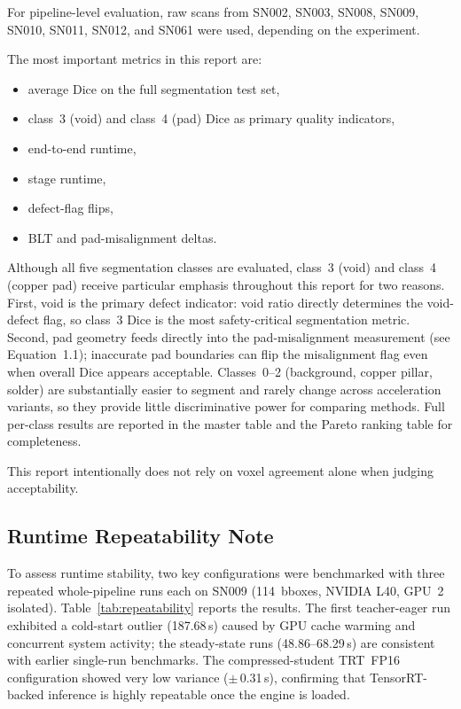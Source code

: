For pipeline-level evaluation, raw scans from SN002,
SN003, SN008, SN009, SN010,
SN011, SN012, and SN061 were used, depending
on the experiment.

The most important metrics in this report are:

\begin{itemize}
\tightlist
\item
  average Dice on the full segmentation test set,
\item
  class~3 (void) and class~4 (pad) Dice as primary quality indicators,
\item
  end-to-end runtime,
\item
  stage runtime,
\item
  defect-flag flips,
\item
  BLT and pad-misalignment deltas.
\end{itemize}

Although all five segmentation classes are evaluated, class~3 (void) and class~4 (copper pad) receive particular emphasis throughout this report for two reasons. First, void is the primary defect indicator: void ratio directly determines the void-defect flag, so class~3 Dice is the most safety-critical segmentation metric. Second, pad geometry feeds directly into the pad-misalignment measurement (see Equation~1.1); inaccurate pad boundaries can flip the misalignment flag even when overall Dice appears acceptable. Classes~0--2 (background, copper pillar, solder) are substantially easier to segment and rarely change across acceleration variants, so they provide little discriminative power for comparing methods. Full per-class results are reported in the master table and the Pareto ranking table for completeness.

This report intentionally does not rely on voxel agreement alone when
judging acceptability.

\hypertarget{runtime-repeatability-note}{%
\subsection{Runtime Repeatability
Note}\label{runtime-repeatability-note}}

To assess runtime stability, two key configurations were benchmarked
with three repeated whole-pipeline runs each on SN009 (114~bboxes,
NVIDIA L40, GPU~2 isolated). Table~\ref{tab:repeatability} reports the
results. The first teacher-eager run exhibited a cold-start outlier
(187.68\,s) caused by GPU cache warming and concurrent system activity;
the steady-state runs (48.86--68.29\,s) are consistent with earlier
single-run benchmarks. The compressed-student TRT~FP16 configuration
showed very low variance ($\pm$\,0.31\,s), confirming that
TensorRT-backed inference is highly repeatable once the engine is loaded.

